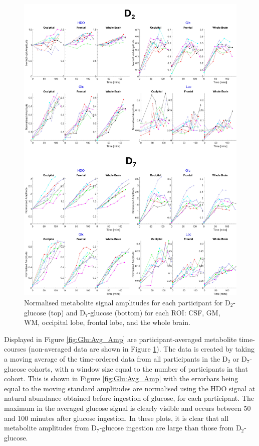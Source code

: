 \documentclass[class=article, crop=false]{standalone}
\begin{document}
\begin{figure}
    \centering
    \includegraphics[width = 1\textwidth]{Figures/Glucose/Ind_Amp.png}
    \caption{Normalised metabolite signal amplitudes for each participant for D$_2$-glucose (top) and D$_7$-glucose (bottom) for each ROI: CSF, GM, WM, occipital lobe, frontal lobe, and the whole brain.}
    \label{fig:Glu:Ind_Amp}
\end{figure}

Displayed in Figure \ref{fig:Glu:Avg_Amp} are participant-averaged metabolite time-courses (non-averaged data are shown in Figure \ref{fig:Glu:Ind_Amp}). The data is created by taking a moving average of the time-ordered data from all participants in the D$_2$ or D$_7$-glucose cohorts, with a window size equal to the number of participants in that cohort. This is shown in Figure \ref{fig:Glu:Avg_Amp} with the errorbars being equal to the moving standard  amplitudes are normalised using the HDO signal at natural abundance obtained before ingestion of glucose, for each participant. The maximum in the averaged glucose signal is clearly visible and occurs between 50 and 100 minutes after glucose ingestion. In these plots, it is clear that all metabolite amplitudes from D$_7$-glucose ingestion are large than those from D$_2$-glucose. 
\end{document}
